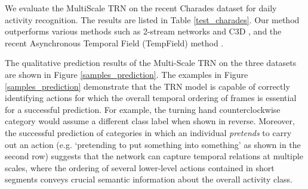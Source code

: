 \documentclass[runningheads]{llncs}
\begin{document}
\begin{table}\vspace{-5mm}
    \centering
    \qquad
    \caption{Jester Dataset Results on (a) the validation set and (b) the test set.}\label{fig:jester_result}\vspace{-6mm}
\end{table}





We evaluate the MultiScale TRN on the recent Charades dataset for daily activity recognition. The results are listed in Table \ref{test_charades}. Our method outperforms various methods such as 2-stream networks and C3D \cite{sigurdsson2016hollywood}, and the recent Asynchronous Temporal Field (TempField) method \cite{sigurdsson2016asynchronous}. 

The qualitative prediction results of the Multi-Scale TRN on the three datasets are shown in Figure \ref{samples_prediction}. The examples in Figure \ref{samples_prediction} demonstrate that the TRN model is capable of correctly identifying actions for which the overall temporal ordering of frames is essential for a successful prediction. For example, the turning hand counterclockwise category would assume a different class label when shown in reverse. Moreover, the successful prediction of categories in which an individual \emph{pretends} to carry out an action (e.g. `pretending to put something into something' as shown in the second row) suggests that the network can capture temporal relations at multiple scales, where the ordering of several lower-level actions contained in short segments conveys crucial semantic information about the overall activity class.
\end{document}
